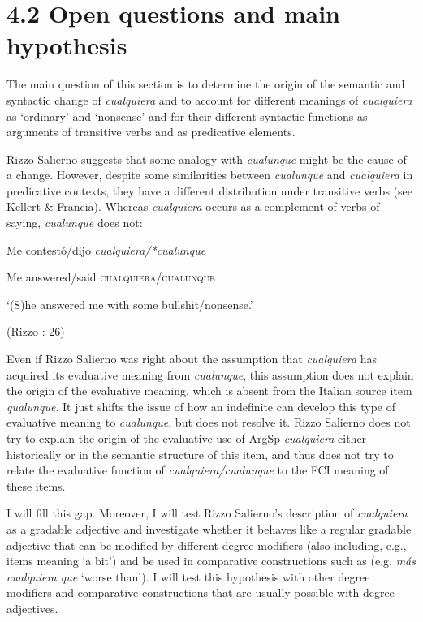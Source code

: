 \section{\textbf{4.2} \textbf{Open} \textbf{questions} \textbf{and} \textbf{main} \textbf{hypothesis}}

The main question of this section is to determine the origin of the semantic and syntactic change of \textit{cualquiera} and to account for different meanings of \textit{cualquiera} as ‘ordinary’ and ‘nonsense’ and for their different syntactic functions as arguments of transitive verbs and as predicative elements.

  Rizzo Salierno suggests that some analogy with \textit{cualunque} might be the cause of a change. However, despite some similarities between \textit{cualunque} and \textit{cualquiera} in predicative contexts, they have a different distribution under transitive verbs (see Kellert \& Francia). Whereas \textit{cualquiera} occurs as a complement of verbs of saying, \textit{cualunque} does not:

    Me  contestó/dijo  \textit{cualquiera/*cualunque}

    Me  answered/said  \textsc{cualquiera/cualunque}

    ‘(S)he answered me with some bullshit/nonsense.’

    (Rizzo \citealt{Salierno2013}: 26)

Even if Rizzo Salierno was right about the assumption that \textit{cualquiera} has acquired its evaluative meaning from \textit{cualunque}, this assumption does not explain the origin of the evaluative meaning, which is absent from the Italian source item \textit{qualunque}. It just shifts the issue of how an indefinite can develop this type of evaluative meaning to \textit{cualunque}, but does not resolve it. Rizzo Salierno does not try to explain the origin of the evaluative use of ArgSp \textit{cualquiera} either historically or in the semantic structure of this item, and thus does not try to relate the evaluative function of \textit{cualquiera/cualunque} to the FCI meaning of these items. 

I will fill this gap. Moreover, I will test Rizzo Salierno’s description of \textit{cualquiera} as a gradable adjective and investigate whether it behaves like a regular gradable adjective that can be modified by different degree modifiers (also including, e.g., items meaning ‘a bit’) and be used in comparative constructions such as (e.g. \textit{más cualquiera que} ‘worse than’). I will test this hypothesis with other degree modifiers and comparative constructions that are usually possible with degree adjectives.

